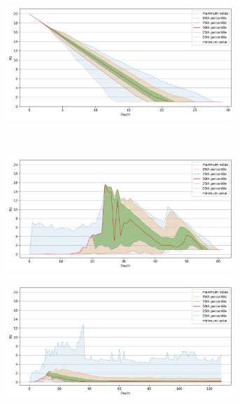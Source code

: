 \begin{figure}
\begin{subfigure}[b]{0.47\textwidth}
        \label{fig:results:sift-lfd}
    \end{subfigure}%
    \begin{subfigure}[b]{0.47\textwidth}
        \includegraphics[width=0.95\textwidth]{images/lfd/random-1000000.png}\\
        \label{fig:results:random-lfd}
    \end{subfigure}
    \\
    \begin{subfigure}[b]{0.47\textwidth}
        \includegraphics[width=0.95\textwidth]{images/lfd/radio-ml-97920.png}\\
        \label{fig:results:radioml-lfd}
    \end{subfigure}%
    \begin{subfigure}[b]{0.47\textwidth}
        \includegraphics[width=0.95\textwidth]{images/lfd/silva-2224640.png}\\

\end{subfigure}
\end{figure}
